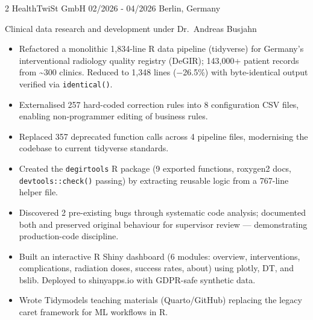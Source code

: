 \documentclass{thejus_cv}
\begin{document}
\begin{paracol}{2}
             {HealthTwiSt GmbH}
             {02/2026 - 04/2026}
             {Berlin, Germany}
             {Clinical data research and development under Dr.~Andreas Busjahn
             \begin{itemize}
                   \item Refactored a monolithic 1,834-line R data pipeline (tidyverse) for Germany's interventional radiology quality registry (DeGIR); 143,000+ patient records from \textasciitilde300 clinics. Reduced to 1,348 lines ($-$26.5\%) with byte-identical output verified via \texttt{identical()}.
                   \item Externalised 257 hard-coded correction rules into 8 configuration CSV files, enabling non-programmer editing of business rules.
                   \item Replaced 357 deprecated function calls across 4 pipeline files, modernising the codebase to current tidyverse standards.
                   \item Created the \texttt{degirtools} R package (9 exported functions, roxygen2 docs, \texttt{devtools::check()} passing) by extracting reusable logic from a 767-line helper file.
                   \item Discovered 2 pre-existing bugs through systematic code analysis; documented both and preserved original behaviour for supervisor review --- demonstrating production-code discipline.
                   \item Built an interactive R Shiny dashboard (6 modules: overview, interventions, complications, radiation doses, success rates, about) using plotly, DT, and bslib. Deployed to shinyapps.io with GDPR-safe synthetic data.
                   \item Wrote Tidymodels teaching materials (Quarto/GitHub) replacing the legacy caret framework for ML workflows in R.
               \end{itemize}}


\end{paracol}
\end{document}
